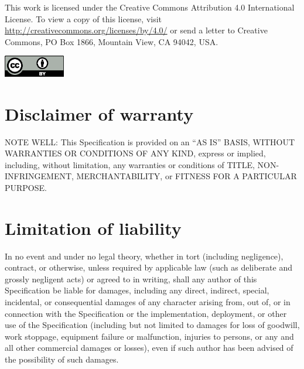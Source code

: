 \documentclass{uavcandoc}
\begin{document}
\begin{titlepage}
This work is licensed under the Creative Commons Attribution 4.0 International License.
To view a copy of this license, visit \url{http://creativecommons.org/licenses/by/4.0/}
or send a letter to Creative Commons, PO Box 1866, Mountain View, CA 94042, USA.

\begin{center}
    \includegraphics[width=0.2\textwidth]{cc-by}
\end{center}

\BeginRightColumn

\section*{Disclaimer of warranty}

NOTE WELL: This Specification is provided on an ``AS IS'' BASIS, WITHOUT WARRANTIES OR CONDITIONS OF ANY KIND,
express or implied, including, without limitation, any warranties or conditions of
TITLE, NON-INFRINGEMENT, MERCHANTABILITY, or FITNESS FOR A PARTICULAR PURPOSE.

\BeginRightColumn

\section*{Limitation of liability}

In no event and under no legal theory, whether in tort (including negligence), contract, or otherwise,
unless required by applicable law (such as deliberate and grossly negligent acts) or agreed to in writing,
shall any author of this Specification be liable for damages,
including any direct, indirect, special, incidental, or consequential damages of any character arising
from, out of, or in connection with the Specification or the implementation, deployment,
or other use of the Specification (including but not limited to damages for loss of goodwill,
work stoppage, equipment failure or malfunction, injuries to persons,
or any and all other commercial damages or losses),
even if such author has been advised of the possibility of such damages.

\end{titlepage}

\tableofcontents
\BeginRightColumn
\listoftables
\BeginRightColumn
\listoffigures

\mainmatter







\end{document}
